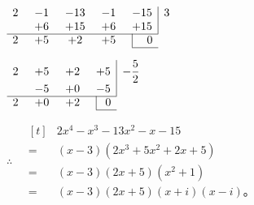 \jie \qquad $\begin{array}[t]{*{4}{c@{\hspace{0.5cm}}}c|l}
    2 & -1 & -13 & -1 & -15 & 3 \\
      & +6 & +15 & +6 & +15 &   \\
    \cline{1-5}
    2 & +5 &  +2 & +5 & \multicolumn{1}{|r}{ 0 } & \\
    \cline{5-5}
\end{array}
$

\phantom{\jie} \qquad $\begin{array}[t]{*{3}{c@{\hspace{0.5cm}}}c|l}
    2 & +5 & +2 & +5 & -\dfrac{5}{2} \\
      & -5 & +0 & -5 &  \\
    \cline{1-4}
    2 & +0 & +2 & \multicolumn{1}{|r}{ 0 } & \\
    \cline{4-4}
\end{array}
$

$\therefore \quad \begin{aligned}[t]
    & 2x^4 - x^3 - 13x^2 -x -15 \\
={} & (x - 3) (2x^3 + 5x^2 + 2x + 5) \\
={} & (x - 3) (2x + 5) (x^2 + 1) \\
={} & (x - 3) (2x + 5) (x + i) (x - i) \text{。}
\end{aligned}$

\lianxi
\begin{xiaotis}

\begin{xiaoxiaotis}



\end{xiaoxiaotis}


\begin{xiaoxiaotis}





\end{xiaoxiaotis}

\end{xiaotis}

